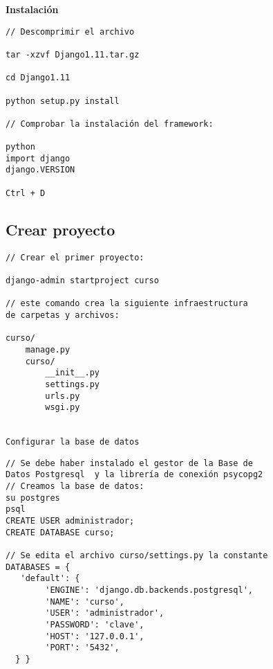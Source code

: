 \documentclass[xcolor=dvipsnames]{beamer}
\begin{document}
\begin{frame}[fragile]

\begin{Large}\textbf{Instalación}\end{Large}
\begin{verbatim}
// Descomprimir el archivo

tar -xzvf Django1.11.tar.gz

cd Django1.11

python setup.py install

// Comprobar la instalación del framework:

python
import django
django.VERSION

Ctrl + D
\end{verbatim}
\end{frame}

\subsection{Crear proyecto}
\begin{frame}[fragile]

\begin{verbatim}
// Crear el primer proyecto:

django-admin startproject curso

// este comando crea la siguiente infraestructura
de carpetas y archivos:

curso/
    manage.py
    curso/
        __init__.py
        settings.py
        urls.py
        wsgi.py


Configurar la base de datos

\end{verbatim}
\end{frame}

\begin{frame}[fragile]

\begin{verbatim}
// Se debe haber instalado el gestor de la Base de
Datos Postgresql  y la librería de conexión psycopg2
// Creamos la base de datos:
su postgres
psql
CREATE USER administrador;
CREATE DATABASE curso;

// Se edita el archivo curso/settings.py la constante
DATABASES = {
   'default': {
        'ENGINE': 'django.db.backends.postgresql',
        'NAME': 'curso',
        'USER': 'administrador',
        'PASSWORD': 'clave',
        'HOST': '127.0.0.1',
        'PORT': '5432',
  } }
\end{verbatim}
\end{frame}
\end{document}
